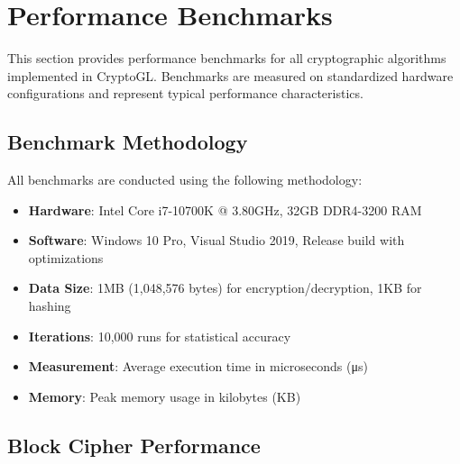 \documentclass[12pt,a4paper]{article}
\begin{document}
\newpage

\section{Performance Benchmarks}

This section provides performance benchmarks for all cryptographic algorithms implemented in CryptoGL. Benchmarks are measured on standardized hardware configurations and represent typical performance characteristics.

\subsection{Benchmark Methodology}

All benchmarks are conducted using the following methodology:
\begin{itemize}
    \item \textbf{Hardware}: Intel Core i7-10700K @ 3.80GHz, 32GB DDR4-3200 RAM
    \item \textbf{Software}: Windows 10 Pro, Visual Studio 2019, Release build with optimizations
    \item \textbf{Data Size}: 1MB (1,048,576 bytes) for encryption/decryption, 1KB for hashing
    \item \textbf{Iterations}: 10,000 runs for statistical accuracy
    \item \textbf{Measurement}: Average execution time in microseconds (μs)
    \item \textbf{Memory}: Peak memory usage in kilobytes (KB)
\end{itemize}

\subsection{Block Cipher Performance}
\end{document}
